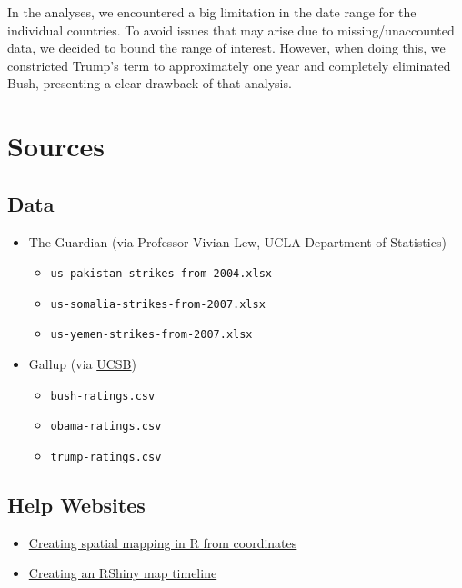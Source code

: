 \documentclass[
]{article}
\providecommand{\tightlist}{%
  \setlength{\itemsep}{0pt}\setlength{\parskip}{0pt}}
\begin{document}
In the analyses, we encountered a big limitation in the date range for
the individual countries. To avoid issues that may arise due to
missing/unaccounted data, we decided to bound the range of interest.
However, when doing this, we constricted Trump's term to approximately
one year and completely eliminated Bush, presenting a clear drawback of
that analysis.

\pagebreak

\hypertarget{sources}{%
\section{Sources}\label{sources}}

\hypertarget{data}{%
\subsection{Data}\label{data}}

\begin{itemize}
\tightlist
\item
  The Guardian (via Professor Vivian Lew, UCLA Department of Statistics)

  \begin{itemize}
  \tightlist
  \item
    \texttt{us-pakistan-strikes-from-2004.xlsx}
  \item
    \texttt{us-somalia-strikes-from-2007.xlsx}
  \item
    \texttt{us-yemen-strikes-from-2007.xlsx}
  \end{itemize}
\item
  Gallup (via
  \href{https://www.presidency.ucsb.edu/statistics/data/presidential-job-approval-all-data}{UCSB})

  \begin{itemize}
  \tightlist
  \item
    \texttt{bush-ratings.csv}
  \item
    \texttt{obama-ratings.csv}
  \item
    \texttt{trump-ratings.csv}
  \end{itemize}
\end{itemize}

\hypertarget{help-websites}{%
\subsection{Help Websites}\label{help-websites}}

\begin{itemize}
\tightlist
\item
  \href{https://stackoverflow.com/questions/14334970/convert-latitude-and-longitude-coordinates-to-country-name-in-r}{Creating
  spatial mapping in R from coordinates}
\item
  \href{https://towardsdatascience.com/eye-catching-animated-maps-in-r-a-simple-introduction-3559d8c33be1}{Creating
  an RShiny map timeline}
\end{itemize}
\end{document}
